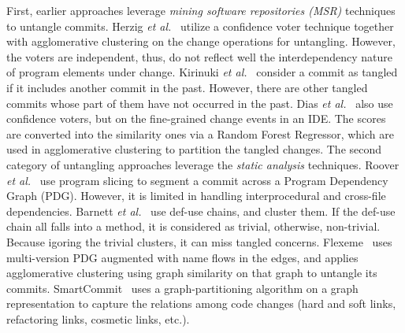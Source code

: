 First, earlier approaches leverage {\em mining software repositories
  (MSR)} techniques to untangle commits. Herzig {\em et
  al.}~\cite{kim-msr13,kim-emse16} utilize a confidence voter
technique together with agglomerative clustering on the change
operations for untangling.
However, the voters are independent, thus, do not reflect well the
interdependency nature of program elements under change.
%
Kirinuki {\em et al.}~\cite{higo-apsec16, higo-icpc14} consider a
commit as tangled if it includes another commit in the past. However,
there are other tangled commits whose part of them have not occurred
in the past.
%
Dias {\em et al.}~\cite{dias-saner15} also use confidence voters, but
on the fine-grained change events in an IDE. The scores are converted
into the similarity ones via a Random Forest Regressor, which are used
in agglomerative clustering to partition the tangled changes.  The
second category of untangling approaches leverage the {\em static
  analysis} techniques. Roover {\em et al.}~\cite{roover-scam18} use
program slicing to segment a commit across a Program Dependency Graph
(PDG).  However, it is limited in handling interprocedural and
cross-file dependencies. Barnett {\em et al.}~\cite{barnett-icse15}
use def-use chains, and cluster them. If the def-use chain all
falls into a method, it is considered as trivial, otherwise,
non-trivial. Because igoring the trivial clusters, it can miss tangled
concerns. Flexeme~\cite{flexeme-fse20} uses
multi-version PDG augmented with name flows in the edges, and
applies agglomerative clustering using graph similarity on that graph
to untangle its commits. SmartCommit~\cite{smartcommit-fse21} uses a
graph-partitioning algorithm on a graph representation to capture
the relations among code changes (hard and soft
links, refactoring links, cosmetic links, etc.).


